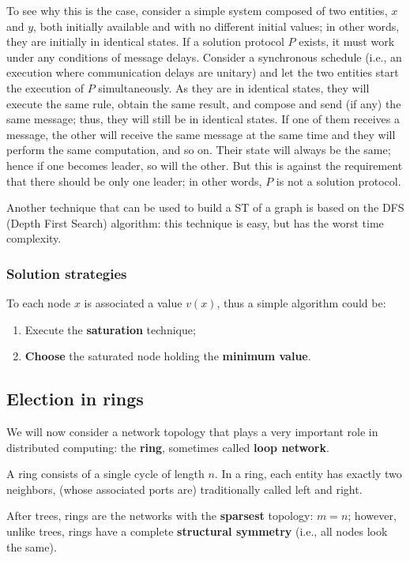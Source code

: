 To see why this is the case, consider a simple system composed of two entities, $x$ and $y$, both initially available and with no different initial values; in other words, they are initially in identical states. If a solution protocol $P$ exists, it must work under any conditions of message delays. Consider a synchronous schedule (i.e., an execution where communication delays are unitary) and let the two entities start the execution of $P$ simultaneously. As they are in identical states, they will execute the same rule, obtain the same result, and compose and send (if any) the same message; thus, they will still be in identical states. If one of them receives a message, the other will receive the same message at the same time and they will perform the same computation, and so on. Their state will always be the same; hence if one becomes leader, so will the other. But this is against the requirement that there should be only one leader; in other words, $P$ is not a solution protocol.

Another technique that can be used to build a ST of a graph is based on the DFS (Depth First Search) algorithm: this technique is easy, but has the worst time complexity.

\subsubsection{Solution strategies}
To each node $x$ is associated a value $v(x)$, thus a simple algorithm could be:
\begin{enumerate}
    \item Execute the \textbf{saturation} technique;
    \item \textbf{Choose} the saturated node holding the \textbf{minimum value}.
\end{enumerate}

\subsection{Election in rings}
We will now consider a network topology that plays a very important role in distributed computing: the \textbf{ring}, sometimes called \textbf{loop network}. 

A ring consists of a single cycle of length $n$. In a ring, each entity has exactly two neighbors, (whose associated ports are) traditionally called left and right.


After trees, rings are the networks with the \textbf{sparsest} topology: $m = n$; however, unlike trees, rings have a complete \textbf{structural symmetry} (i.e., all nodes look the same). 

